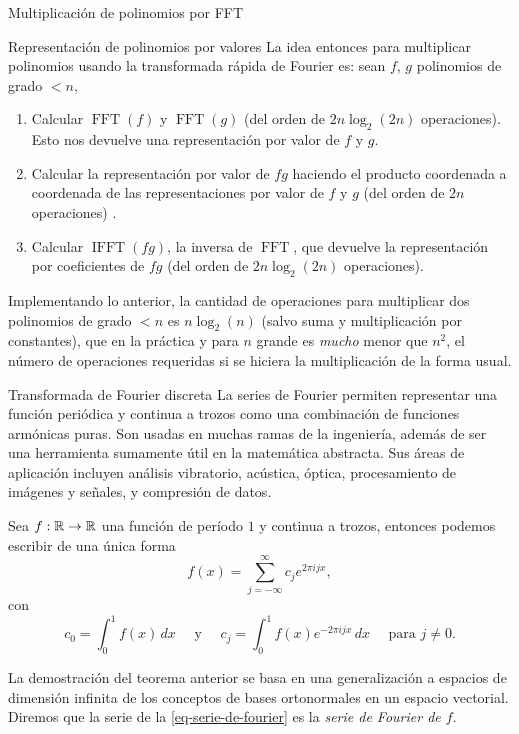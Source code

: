 \begin{chapter}{Multiplicación de polinomios por FFT}
\begin{section}{Representación de polinomios por valores}
  La idea entonces para multiplicar polinomios usando la transformada rápida de Fourier es:  sean $f$, $g$ polinomios de grado $<n$,
  \begin{enumerate}
      \item Calcular $\operatorname{FFT}(f)$ y $\operatorname{FFT}(g)$ (del orden de $2n\operatorname{log}_2(2n)$ operaciones). Esto nos devuelve una representación por valor de $f$ y $g$.
      \item Calcular  la representación por valor de $fg$ haciendo el producto coordenada a coordenada de las representaciones por valor de $f$ y $g$ (del orden de $2n$ operaciones)  .
      \item Calcular $\operatorname{IFFT}(fg)$, la inversa de $\operatorname{FFT}$, que devuelve la representación por coeficientes de $fg$ (del orden de $2n\operatorname{log}_2(2n)$ operaciones).
  \end{enumerate}

  Implementando lo anterior, la cantidad de operaciones para multiplicar dos polinomios de grado $<n$  es $n \log_2(n)$ (salvo suma y multiplicación por constantes), que en la práctica y para $n$ grande es \textit{mucho} menor que $n^2$, el número de operaciones requeridas si se hiciera la multiplicación de la forma usual.

 \end{section}

 \begin{section}{Transformada de Fourier discreta} La series de Fourier permiten representar una función periódica y continua a trozos como una combinación de funciones armónicas puras. Son usadas en muchas ramas de la ingeniería, además de ser una herramienta sumamente útil en la matemática abstracta. Sus áreas de aplicación incluyen análisis vibratorio, acústica, óptica, procesamiento de imágenes y señales, y compresión de datos.

  \begin{teorema}\label{th-series-de-fourier}
      Sea $f: \mathbb R \to \mathbb R$ una función de período $1$ y continua a trozos, entonces podemos escribir de una única forma
      \begin{equation}\label{eq-serie-de-fourier}
          f(x) = \sum_{ j= -\infty}^\infty c_j e^{2\pi ijx},
      \end{equation}
      con
      $$
      c_0 = \int_0^1 f(x) \, dx \quad \text{ y } \quad c_j = \int_0^1 f(x) e^{-2\pi ijx} \, dx \quad \text{ para } j \ne 0.
      $$ 
  \end{teorema}
  La demostración del teorema anterior se basa en una generalización a espacios de dimensión infinita de los conceptos de bases ortonormales en un espacio vectorial. Diremos que la serie de la \eqref{eq-serie-de-fourier} es la \textit{serie de Fourier de $f$}.


\end{section}
\end{chapter}
